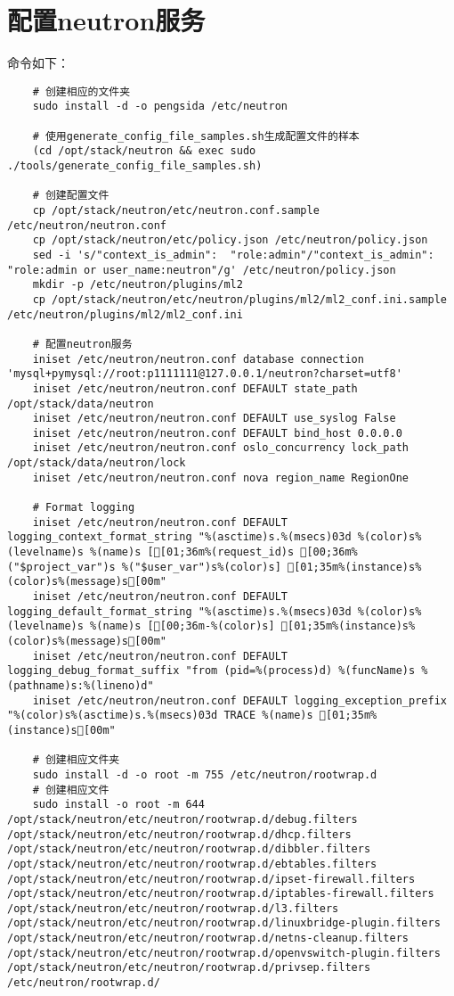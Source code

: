 \documentclass[a4paper,left=1.5cm,right=1.5cm,11pt]{article}
\begin{document}
\section{配置neutron服务}
	命令如下：
	\begin{lstlisting}
	# 创建相应的文件夹
	sudo install -d -o pengsida /etc/neutron

	# 使用generate_config_file_samples.sh生成配置文件的样本
	(cd /opt/stack/neutron && exec sudo ./tools/generate_config_file_samples.sh)

	# 创建配置文件
	cp /opt/stack/neutron/etc/neutron.conf.sample /etc/neutron/neutron.conf
	cp /opt/stack/neutron/etc/policy.json /etc/neutron/policy.json
	sed -i 's/"context_is_admin":  "role:admin"/"context_is_admin":  "role:admin or user_name:neutron"/g' /etc/neutron/policy.json
	mkdir -p /etc/neutron/plugins/ml2
	cp /opt/stack/neutron/etc/neutron/plugins/ml2/ml2_conf.ini.sample /etc/neutron/plugins/ml2/ml2_conf.ini
	
	# 配置neutron服务
	iniset /etc/neutron/neutron.conf database connection 'mysql+pymysql://root:p1111111@127.0.0.1/neutron?charset=utf8'
	iniset /etc/neutron/neutron.conf DEFAULT state_path /opt/stack/data/neutron
	iniset /etc/neutron/neutron.conf DEFAULT use_syslog False
	iniset /etc/neutron/neutron.conf DEFAULT bind_host 0.0.0.0
	iniset /etc/neutron/neutron.conf oslo_concurrency lock_path /opt/stack/data/neutron/lock
	iniset /etc/neutron/neutron.conf nova region_name RegionOne

	# Format logging
	iniset /etc/neutron/neutron.conf DEFAULT logging_context_format_string "%(asctime)s.%(msecs)03d %(color)s%(levelname)s %(name)s [[01;36m%(request_id)s [00;36m%("$project_var")s %("$user_var")s%(color)s] [01;35m%(instance)s%(color)s%(message)s[00m"
	iniset /etc/neutron/neutron.conf DEFAULT logging_default_format_string "%(asctime)s.%(msecs)03d %(color)s%(levelname)s %(name)s [[00;36m-%(color)s] [01;35m%(instance)s%(color)s%(message)s[00m"
	iniset /etc/neutron/neutron.conf DEFAULT logging_debug_format_suffix "from (pid=%(process)d) %(funcName)s %(pathname)s:%(lineno)d"
	iniset /etc/neutron/neutron.conf DEFAULT logging_exception_prefix "%(color)s%(asctime)s.%(msecs)03d TRACE %(name)s [01;35m%(instance)s[00m"

	# 创建相应文件夹
	sudo install -d -o root -m 755 /etc/neutron/rootwrap.d
	# 创建相应文件
	sudo install -o root -m 644 /opt/stack/neutron/etc/neutron/rootwrap.d/debug.filters /opt/stack/neutron/etc/neutron/rootwrap.d/dhcp.filters /opt/stack/neutron/etc/neutron/rootwrap.d/dibbler.filters /opt/stack/neutron/etc/neutron/rootwrap.d/ebtables.filters /opt/stack/neutron/etc/neutron/rootwrap.d/ipset-firewall.filters /opt/stack/neutron/etc/neutron/rootwrap.d/iptables-firewall.filters /opt/stack/neutron/etc/neutron/rootwrap.d/l3.filters /opt/stack/neutron/etc/neutron/rootwrap.d/linuxbridge-plugin.filters /opt/stack/neutron/etc/neutron/rootwrap.d/netns-cleanup.filters /opt/stack/neutron/etc/neutron/rootwrap.d/openvswitch-plugin.filters /opt/stack/neutron/etc/neutron/rootwrap.d/privsep.filters /etc/neutron/rootwrap.d/
	

\end{lstlisting}
\end{document}
